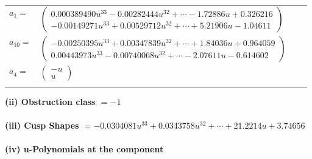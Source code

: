\documentclass[1p]{elsarticle_modified}
\theoremstyle{definition}
\begin{document}
\begin{tabular}{m{7pt} m{180pt} m{7pt} m{180pt} }
\flushright $a_{1}=$&$\begin{pmatrix}0.000389490 u^{33}-0.00282444 u^{32}+\cdots-1.72886 u+0.326216\\-0.00149271 u^{33}+0.00529712 u^{32}+\cdots+5.21906 u-1.04611\end{pmatrix}$ \\
\flushright $a_{10}=$&$\begin{pmatrix}-0.00250395 u^{33}+0.00347839 u^{32}+\cdots+1.84036 u+0.964059\\0.00443973 u^{33}-0.00740068 u^{32}+\cdots-2.07611 u-0.614602\end{pmatrix}$ \\
\flushright $a_{4}=$&$\begin{pmatrix}- u\\u\end{pmatrix}$\\&\end{tabular}
\flushleft \textbf{(ii) Obstruction class $= -1$}\\~\\
\flushleft \textbf{(iii) Cusp Shapes $= -0.0304081 u^{33}+0.0343758 u^{32}+\cdots+21.2214 u+3.74656$}\\~\\
\newpage\renewcommand{\arraystretch}{1}
\flushleft \textbf{(iv) u-Polynomials at the component}\newline \\
\end{document}
